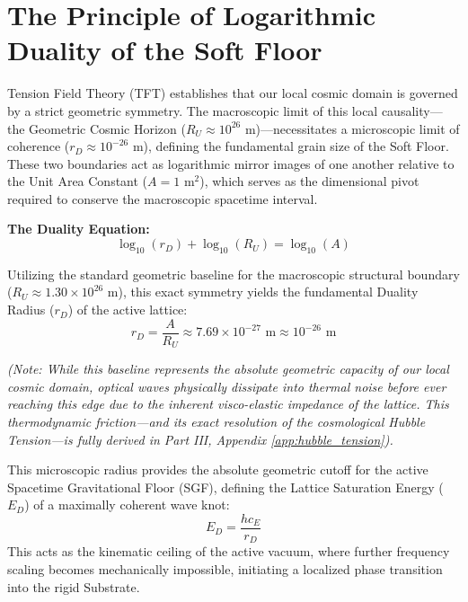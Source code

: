 \section{The Principle of Logarithmic Duality of the Soft Floor}
Tension Field Theory (TFT) establishes that our local cosmic domain is governed by a strict geometric symmetry. The macroscopic limit of this local causality---the Geometric Cosmic Horizon ($R_U \approx 10^{26} \text{ m}$)---necessitates a microscopic limit of coherence ($r_D \approx 10^{-26} \text{ m}$), defining the fundamental grain size of the Soft Floor. These two boundaries act as logarithmic mirror images of one another relative to the Unit Area Constant ($A = 1 \text{ m}^2$), which serves as the dimensional pivot required to conserve the macroscopic spacetime interval.

\textbf{The Duality Equation:}
\begin{equation}
\log_{10} (r_D) + \log_{10} (R_U) = \log_{10} (A)
\end{equation}

Utilizing the standard geometric baseline for the macroscopic structural boundary ($R_U \approx 1.30 \times 10^{26} \text{ m}$), this exact symmetry yields the fundamental Duality Radius ($r_D$) of the active lattice:
\begin{equation}
r_D = \frac{A}{R_U} \approx 7.69 \times 10^{-27} \text{ m} \approx 10^{-26} \text{ m}
\end{equation}

\textit{(Note: While this baseline represents the absolute geometric capacity of our local cosmic domain, optical waves physically dissipate into thermal noise before ever reaching this edge due to the inherent visco-elastic impedance of the lattice. This thermodynamic friction---and its exact resolution of the cosmological Hubble Tension---is fully derived in Part III, Appendix \ref{app:hubble_tension}).}

This microscopic radius provides the absolute geometric cutoff for the active Spacetime Gravitational Floor (SGF), defining the Lattice Saturation Energy ($E_D$) of a maximally coherent wave knot:
\begin{equation}
E_D = \frac{hc_E}{r_D}
\end{equation}
This acts as the kinematic ceiling of the active vacuum, where further frequency scaling becomes mechanically impossible, initiating a localized phase transition into the rigid Substrate.

